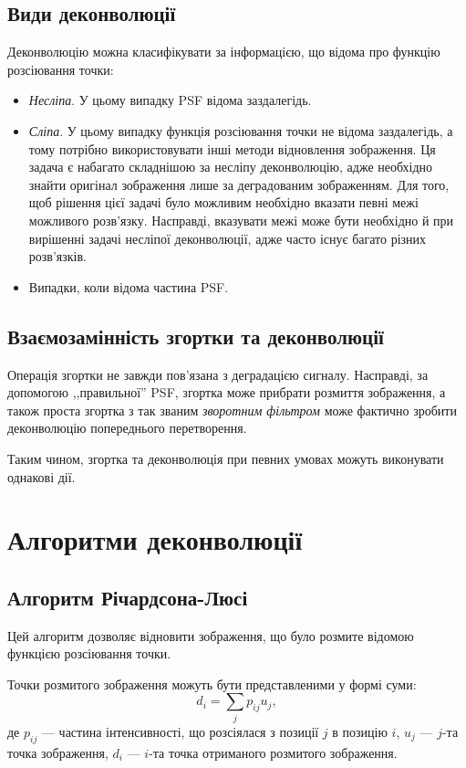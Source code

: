 \documentclass[simple,14pt,utf8,ukrainian]{eskdtext}
\begin{document}
  \subsection{Види деконволюції}
    Деконволюцію можна класифікувати за інформацією, що відома про функцію
    розсіювання точки:
    \begin{itemize}
      \item \emph{Несліпа}.
        У цьому випадку PSF відома заздалегідь.
      \item \emph{Сліпа}.
        У цьому випадку функція розсіювання точки не відома заздалегідь, а
        тому потрібно використовувати інші методи відновлення зображення.
        Ця задача є набагато складнішою за несліпу деконволюцію, адже
        необхідно знайти оригінал зображення лише за деградованим зображенням.
        Для того, щоб рішення цієї задачі було можливим необхідно вказати
        певні межі можливого розв’язку.
        Насправді, вказувати межі може бути необхідно й при вирішенні задачі
        несліпої деконволюції, адже часто існує багато різних розв’язків.
      \item Випадки, коли відома частина PSF.
    \end{itemize}
    \clearpage

  \subsection{Взаємозамінність згортки та деконволюції}
    Операція згортки не завжди пов’язана з деградацією сигналу.
    Насправді, за допомогою ,,правильної'' PSF, згортка може прибрати розмиття
    зображення, а також проста згортка з так званим \emph{зворотним фільтром}
    може фактично зробити деконволюцію попереднього перетворення.

    Таким чином, згортка та деконволюція при певних умовах можуть виконувати
    однакові дії.
  \clearpage
  \section{Алгоритми деконволюції}
  \subsection{Алгоритм Річардсона-Люсі}
    Цей алгоритм дозволяє відновити зображення, що було розмите відомою
    функцією розсіювання точки.

    Точки розмитого зображення можуть бути представленими у формі суми:
    \[ d_i = \sum_j p_{ij} u_j, \]
    де $p_{ij}$ --- частина інтенсивності, що розсіялася з позиції $j$ в
    позицію $i$, $u_j$ --- $j$-та точка зображення, $d_i$ --- $i$-та точка
    отриманого розмитого зображення.\cite{richardson-hadley}
\end{document}
